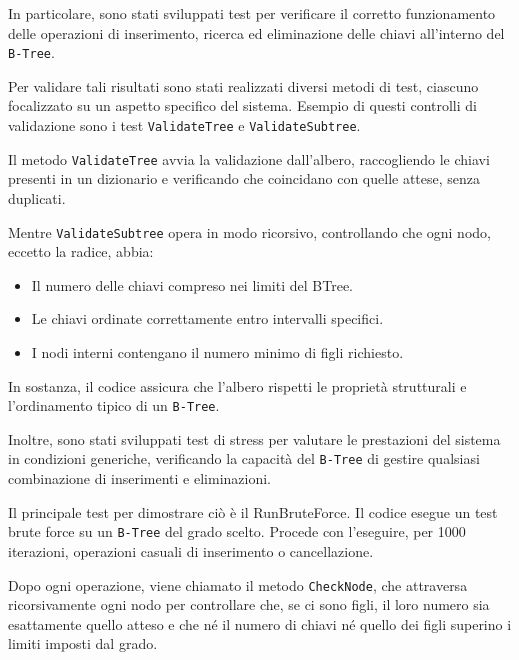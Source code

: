 \documentclass[12pt,a4paper,openright,twoside]{book}
\begin{document}
            In particolare, sono stati sviluppati test per verificare il corretto funzionamento delle operazioni di inserimento, ricerca ed eliminazione delle chiavi all'interno del \texttt{B-Tree}.

            Per validare tali risultati sono stati realizzati diversi metodi di test, ciascuno focalizzato su un aspetto specifico del sistema. Esempio di questi controlli di validazione sono i test \texttt{ValidateTree} e \texttt{ValidateSubtree}.

            Il metodo \texttt{ValidateTree} avvia la validazione dall'albero, raccogliendo le chiavi presenti in un dizionario e verificando che coincidano con quelle attese, senza duplicati.

            Mentre \texttt{ValidateSubtree} opera in modo ricorsivo, controllando che ogni nodo, eccetto la radice, abbia:

            \begin{itemize}
                \item Il numero delle chiavi compreso nei limiti del BTree.
                \item Le chiavi ordinate correttamente entro intervalli specifici.
                \item I nodi interni contengano il numero minimo di figli richiesto.
            \end{itemize}

            In sostanza, il codice assicura che l'albero rispetti le proprietà strutturali e l'ordinamento tipico di un \texttt{B-Tree}.

            

            \clearpage

            Inoltre, sono stati sviluppati test di stress per valutare le prestazioni del sistema in condizioni generiche, verificando la capacità del \texttt{B-Tree} di gestire qualsiasi combinazione di inserimenti e eliminazioni.

            Il principale test per dimostrare ciò è il RunBruteForce. Il codice esegue un test brute force su un \texttt{B-Tree} del grado scelto. Procede con l'eseguire, per 1000 iterazioni, operazioni casuali di inserimento o cancellazione.

            Dopo ogni operazione, viene chiamato il metodo \texttt{CheckNode}, che attraversa ricorsivamente ogni nodo per controllare che, se ci sono figli, il loro numero sia esattamente quello atteso e che né il numero di chiavi né quello dei figli superino i limiti imposti dal grado.
\end{document}
